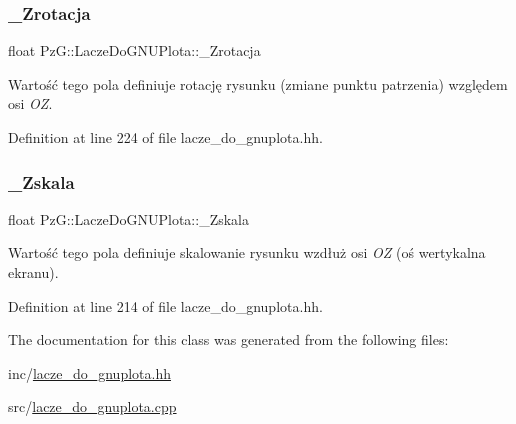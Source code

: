 \mbox{\label{class_pz_g_1_1_lacze_do_g_n_u_plota_aa65781b1ff96dfb31a780e98ee28d6ed}} 
\subsubsection{\texorpdfstring{\+\_\+\+Zrotacja}{\_Zrotacja}}
{\footnotesize\ttfamily float Pz\+G\+::\+Lacze\+Do\+G\+N\+U\+Plota\+::\+\_\+\+Zrotacja\hspace{0.3cm}{\ttfamily [protected]}}

Wartość tego pola definiuje rotację rysunku (zmiane punktu patrzenia) względem osi {\itshape OZ}. 

Definition at line 224 of file lacze\+\_\+do\+\_\+gnuplota.\+hh.

\mbox{\label{class_pz_g_1_1_lacze_do_g_n_u_plota_a85446d06b2d714b2f852ef43c47c73c1}} 
\subsubsection{\texorpdfstring{\+\_\+\+Zskala}{\_Zskala}}
{\footnotesize\ttfamily float Pz\+G\+::\+Lacze\+Do\+G\+N\+U\+Plota\+::\+\_\+\+Zskala\hspace{0.3cm}{\ttfamily [protected]}}

Wartość tego pola definiuje skalowanie rysunku wzdłuż osi {\itshape OZ} (oś wertykalna ekranu). 

Definition at line 214 of file lacze\+\_\+do\+\_\+gnuplota.\+hh.



The documentation for this class was generated from the following files\+:\begin{DoxyCompactItemize}
\item 
inc/\hyperlink{lacze__do__gnuplota_8hh}{lacze\+\_\+do\+\_\+gnuplota.\+hh}\item 
src/\hyperlink{lacze__do__gnuplota_8cpp}{lacze\+\_\+do\+\_\+gnuplota.\+cpp}\end{DoxyCompactItemize}
